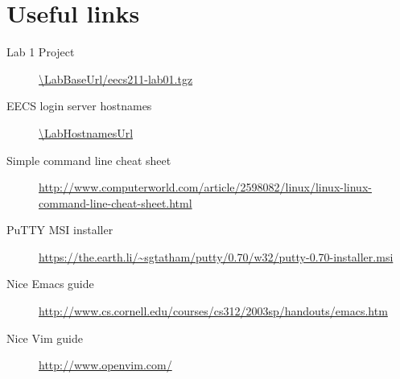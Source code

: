 \documentclass{tufte-handout}
\def\PuTTYurl{https://the.earth.li/~sgtatham/putty/0.70/w32/putty-0.70-installer.msi}
\def\ThisLabBase{eecs211-lab01}
\def\ThisLabUrl{\LabBaseUrl/\ThisLabBase.tgz}
\begin{document}
\section{Useful links}

\begin{description}

  \item[Lab 1 Project]
\url{\ThisLabUrl}

\item[EECS login server hostnames]
\url{\LabHostnamesUrl}

\item[Simple command line cheat sheet]
\url{http://www.computerworld.com/article/2598082/linux/linux-linux-command-line-cheat-sheet.html}

\item[PuTTY MSI installer]
\url{\PuTTYurl}

\item[Nice Emacs guide]
\url{http://www.cs.cornell.edu/courses/cs312/2003sp/handouts/emacs.htm}

\item[Nice Vim guide]
\url{http://www.openvim.com/}

\end{description}
\end{document}
